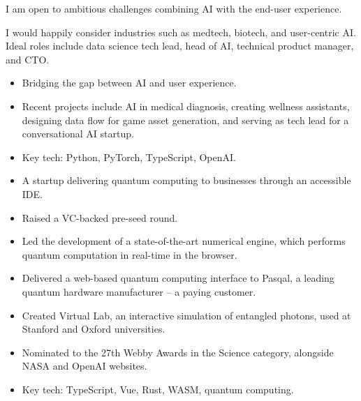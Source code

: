 \documentclass[10pt,a4paper,ragged2e,withhyper]{altacv}
\begin{document}
\begin{paracol}{2}


I am open to ambitious challenges combining AI with the end-user experience.

\divider

I would happily consider industries such as medtech, biotech, and user-centric AI. Ideal roles include data science tech lead, head of AI, technical product manager, and CTO.


\begin{itemize}
\item Bridging the gap between AI and user experience.
\item Recent projects include AI in medical diagnosis, creating wellness assistants, designing data flow for game asset generation, and serving as tech lead for a conversational AI startup.
\item Key tech: Python, PyTorch, TypeScript, OpenAI.
\end{itemize}

\begin{itemize}
\item A startup delivering quantum computing to businesses through an accessible IDE.
\item Raised a VC-backed pre-seed round.
\item Led the development of a state-of-the-art numerical engine, which performs quantum computation in real-time in the browser.
\item Delivered a web-based quantum computing interface to Pasqal, a leading quantum hardware manufacturer -- a paying customer.
\item Created Virtual Lab, an interactive simulation of entangled photons, used at Stanford and Oxford universities.
\item Nominated to the 27th Webby Awards in the Science category, alongside NASA and OpenAI websites.
\item Key tech: TypeScript, Vue, Rust, WASM, quantum computing.
\end{itemize}

\divider


\end{paracol}
\end{document}
